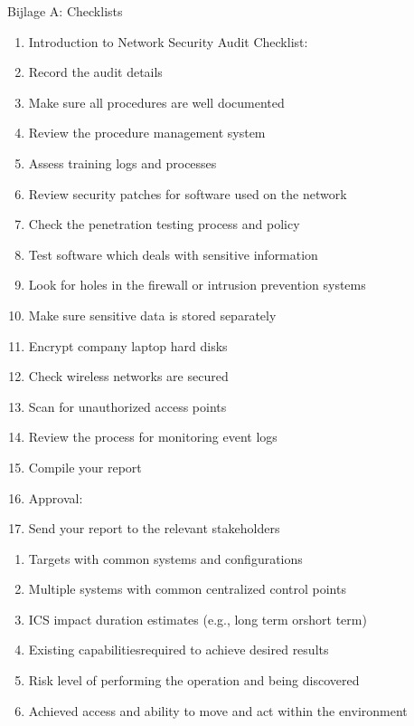 		
		Bijlage A: Checklists
		\begin{enumerate}
			\item Introduction to Network Security Audit Checklist:
			\item Record the audit details
			\item Make sure all procedures are well documented
			\item Review the procedure management system
			\item Assess training logs and processes
			\item Review security patches for software used on the network
			\item Check the penetration testing process and policy
			\item Test software which deals with sensitive information
			\item Look for holes in the firewall or intrusion prevention systems
			\item Make sure sensitive data is stored separately
			\item Encrypt company laptop hard disks
			\item Check wireless networks are secured
			\item Scan for unauthorized access points
			\item Review the process for monitoring event logs
			\item Compile your report
			\item Approval:
			\item Send your report to the relevant stakeholders
		\end{enumerate}
		
		\begin{enumerate}
			\item Targets with common systems and configurations
			\item  Multiple systems with common centralized control points
			\item ICS impact duration estimates (e.g., long term orshort term)
			\item Existing capabilitiesrequired to achieve desired results
			\item Risk level of performing the operation and being discovered
			\item Achieved access and ability to move and act within the environment
		\end{enumerate}
